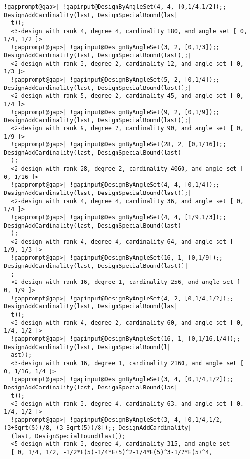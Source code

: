 \documentclass[a4paper,11pt]{report}
\begin{document}
{{\begin{Verbatim}[commandchars=!@|,fontsize=\small,frame=single,label=Example]
  !gapprompt@gap>| !gapinput@DesignByAngleSet(4, 4, [0,1/4,1/2]);; DesignAddCardinality(last, DesignSpecialBound(las|
  t));
  <3-design with rank 4, degree 4, cardinality 180, and angle set [ 0, 1/4, 1/2 ]>
  !gapprompt@gap>| !gapinput@DesignByAngleSet(3, 2, [0,1/3]);; DesignAddCardinality(last, DesignSpecialBound(last));|
  <2-design with rank 3, degree 2, cardinality 12, and angle set [ 0, 1/3 ]>
  !gapprompt@gap>| !gapinput@DesignByAngleSet(5, 2, [0,1/4]);; DesignAddCardinality(last, DesignSpecialBound(last));|
  <2-design with rank 5, degree 2, cardinality 45, and angle set [ 0, 1/4 ]>
  !gapprompt@gap>| !gapinput@DesignByAngleSet(9, 2, [0,1/9]);; DesignAddCardinality(last, DesignSpecialBound(last));|
  <2-design with rank 9, degree 2, cardinality 90, and angle set [ 0, 1/9 ]>
  !gapprompt@gap>| !gapinput@DesignByAngleSet(28, 2, [0,1/16]);; DesignAddCardinality(last, DesignSpecialBound(last)|
  );
  <2-design with rank 28, degree 2, cardinality 4060, and angle set [ 0, 1/16 ]>
  !gapprompt@gap>| !gapinput@DesignByAngleSet(4, 4, [0,1/4]);; DesignAddCardinality(last, DesignSpecialBound(last));|
  <2-design with rank 4, degree 4, cardinality 36, and angle set [ 0, 1/4 ]>
  !gapprompt@gap>| !gapinput@DesignByAngleSet(4, 4, [1/9,1/3]);; DesignAddCardinality(last, DesignSpecialBound(last)|
  );
  <2-design with rank 4, degree 4, cardinality 64, and angle set [ 1/9, 1/3 ]>
  !gapprompt@gap>| !gapinput@DesignByAngleSet(16, 1, [0,1/9]);; DesignAddCardinality(last, DesignSpecialBound(last))|
  ;
  <2-design with rank 16, degree 1, cardinality 256, and angle set [ 0, 1/9 ]>
  !gapprompt@gap>| !gapinput@DesignByAngleSet(4, 2, [0,1/4,1/2]);; DesignAddCardinality(last, DesignSpecialBound(las|
  t));
  <3-design with rank 4, degree 2, cardinality 60, and angle set [ 0, 1/4, 1/2 ]>
  !gapprompt@gap>| !gapinput@DesignByAngleSet(16, 1, [0,1/16,1/4]);; DesignAddCardinality(last, DesignSpecialBound(l|
  ast));
  <3-design with rank 16, degree 1, cardinality 2160, and angle set [ 0, 1/16, 1/4 ]>
  !gapprompt@gap>| !gapinput@DesignByAngleSet(3, 4, [0,1/4,1/2]);; DesignAddCardinality(last, DesignSpecialBound(las|
  t));
  <3-design with rank 3, degree 4, cardinality 63, and angle set [ 0, 1/4, 1/2 ]>
  !gapprompt@gap>| !gapinput@DesignByAngleSet(3, 4, [0,1/4,1/2,(3+Sqrt(5))/8, (3-Sqrt(5))/8]);; DesignAddCardinality|
  (last, DesignSpecialBound(last));
  <5-design with rank 3, degree 4, cardinality 315, and angle set
  [ 0, 1/4, 1/2, -1/2*E(5)-1/4*E(5)^2-1/4*E(5)^3-1/2*E(5)^4,

\end{Verbatim}}}
\end{document}
